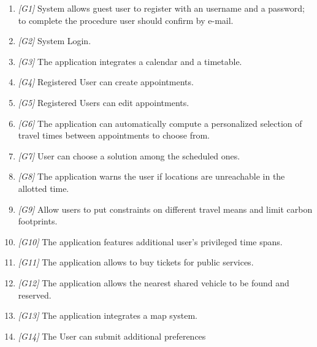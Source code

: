 \begin{enumerate}
	\item \textit{[G1]} 
		System allows guest user to register with an username and a password; to complete the procedure user should confirm by e-mail.
	\item \textit{[G2]} System Login.
	\item \textit{[G3]} The application integrates a calendar and a timetable.
	\item \textit{[G4]} Registered User can create appointments. 
	\item \textit{[G5]} Registered Users can edit appointments.
	\item \textit{[G6]} The application can automatically compute a personalized selection of travel times between appointments to choose from.
	\item \textit{[G7]} User can choose a solution among the scheduled ones.
	\item \textit{[G8]} The application warns the user if locations are unreachable in the allotted time.
	\item \textit{[G9]} Allow users to put constraints on different travel means and limit carbon footprints.
	\item \textit{[G10]} The application features additional user’s privileged time spans.
	\item \textit{[G11]} The application allows to buy tickets for public services.
	\item \textit{[G12]} The application allows the nearest shared vehicle to be found and reserved.
	\item \textit{[G13]} The application integrates a map system.
	\item \textit{[G14]} The User can submit additional preferences
		
\end{enumerate}	

